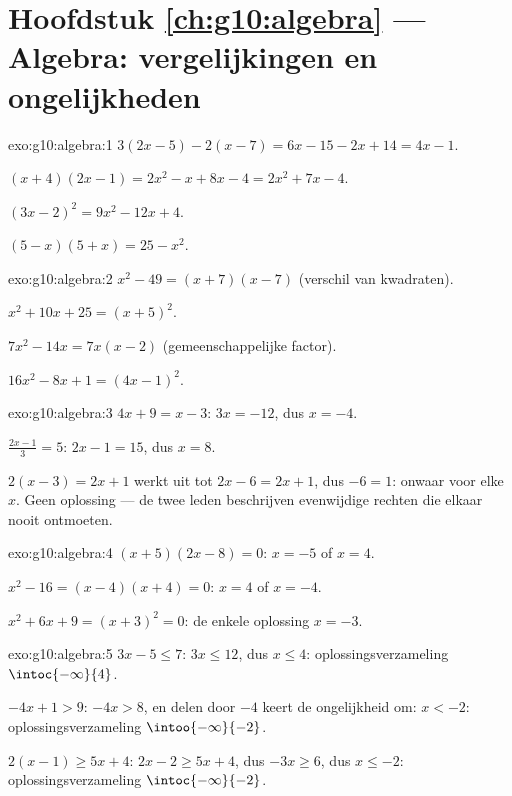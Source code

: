 \section*{Hoofdstuk \ref{ch:g10:algebra} --- Algebra: vergelijkingen en ongelijkheden}

\begin{solution}{exo:g10:algebra:1}
$3(2x-5) - 2(x-7) = 6x - 15 - 2x + 14 = 4x - 1$.

$(x+4)(2x-1) = 2x^2 - x + 8x - 4 = 2x^2 + 7x - 4$.

$(3x-2)^2 = 9x^2 - 12x + 4$.

$(5-x)(5+x) = 25 - x^2$.
\end{solution}

\begin{solution}{exo:g10:algebra:2}
$x^2 - 49 = (x+7)(x-7)$ (verschil van kwadraten).

$x^2 + 10x + 25 = (x+5)^2$.

$7x^2 - 14x = 7x(x - 2)$ (gemeenschappelijke factor).

$16x^2 - 8x + 1 = (4x - 1)^2$.
\end{solution}

\begin{solution}{exo:g10:algebra:3}
$4x + 9 = x - 3$: $3x = -12$, dus $x = -4$.

$\frac{2x-1}{3} = 5$: $2x - 1 = 15$, dus $x = 8$.

$2(x-3) = 2x + 1$ werkt uit tot $2x - 6 = 2x + 1$, dus $-6 = 1$: onwaar voor
elke $x$. Geen oplossing --- de twee leden beschrijven evenwijdige rechten
die elkaar nooit ontmoeten.
\end{solution}

\begin{solution}{exo:g10:algebra:4}
$(x+5)(2x-8) = 0$: $x = -5$ of $x = 4$.

$x^2 - 16 = (x-4)(x+4) = 0$: $x = 4$ of $x = -4$.

$x^2 + 6x + 9 = (x+3)^2 = 0$: de enkele oplossing $x = -3$.
\end{solution}

\begin{solution}{exo:g10:algebra:5}
$3x - 5 \leq 7$: $3x \leq 12$, dus $x \leq 4$: oplossingsverzameling
$\intoc{-\infty}{4}$.

$-4x + 1 > 9$: $-4x > 8$, en delen door $-4$ keert de ongelijkheid om:
$x < -2$: oplossingsverzameling $\intoo{-\infty}{-2}$.

$2(x-1) \geq 5x + 4$: $2x - 2 \geq 5x + 4$, dus $-3x \geq 6$, dus
$x \leq -2$: oplossingsverzameling $\intoc{-\infty}{-2}$.
\end{solution}

